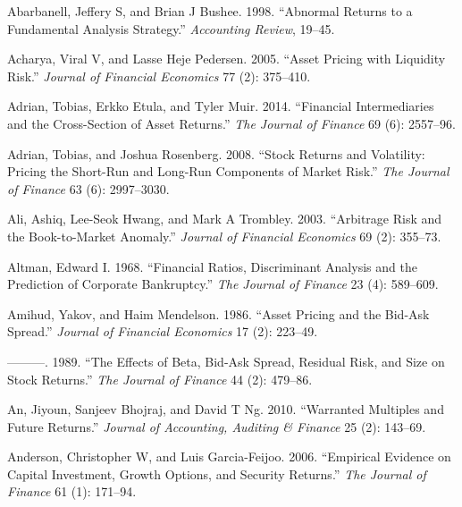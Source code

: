 \documentclass[
  letterpaper,
  DIV=11,
  numbers=noendperiod]{scrreprt}
\newlength{\cslhangindent}
\newlength{\cslentryspacingunit} %
\newenvironment{CSLReferences}[2] %
 {%
  \setlength{\parindent}{0pt}
  \ifodd #1
  \let\oldpar\par
  \def\par{\hangindent=\cslhangindent\oldpar}
  \fi
  \setlength{\parskip}{#2\cslentryspacingunit}
 }%
 {}
\begin{document}
\hypertarget{refs}{}
\begin{CSLReferences}{1}{0}
\leavevmode{}%
Abarbanell, Jeffery S, and Brian J Bushee. 1998. {``Abnormal Returns to
a Fundamental Analysis Strategy.''} \emph{Accounting Review}, 19--45.

\leavevmode{}%
Acharya, Viral V, and Lasse Heje Pedersen. 2005. {``Asset Pricing with
Liquidity Risk.''} \emph{Journal of Financial Economics} 77 (2):
375--410.

\leavevmode{}%
Adrian, Tobias, Erkko Etula, and Tyler Muir. 2014. {``Financial
Intermediaries and the Cross-Section of Asset Returns.''} \emph{The
Journal of Finance} 69 (6): 2557--96.

\leavevmode{}%
Adrian, Tobias, and Joshua Rosenberg. 2008. {``Stock Returns and
Volatility: Pricing the Short-Run and Long-Run Components of Market
Risk.''} \emph{The Journal of Finance} 63 (6): 2997--3030.

\leavevmode{}%
Ali, Ashiq, Lee-Seok Hwang, and Mark A Trombley. 2003. {``Arbitrage Risk
and the Book-to-Market Anomaly.''} \emph{Journal of Financial Economics}
69 (2): 355--73.

\leavevmode{}%
Altman, Edward I. 1968. {``Financial Ratios, Discriminant Analysis and
the Prediction of Corporate Bankruptcy.''} \emph{The Journal of Finance}
23 (4): 589--609.

\leavevmode{}%
Amihud, Yakov, and Haim Mendelson. 1986. {``Asset Pricing and the
Bid-Ask Spread.''} \emph{Journal of Financial Economics} 17 (2):
223--49.

\leavevmode{}%
---------. 1989. {``The Effects of Beta, Bid-Ask Spread, Residual Risk,
and Size on Stock Returns.''} \emph{The Journal of Finance} 44 (2):
479--86.

\leavevmode{}%
An, Jiyoun, Sanjeev Bhojraj, and David T Ng. 2010. {``Warranted
Multiples and Future Returns.''} \emph{Journal of Accounting, Auditing
\& Finance} 25 (2): 143--69.

\leavevmode{}%
Anderson, Christopher W, and Luis Garcia-Feijoo. 2006. {``Empirical
Evidence on Capital Investment, Growth Options, and Security Returns.''}
\emph{The Journal of Finance} 61 (1): 171--94.


\end{CSLReferences}
\end{document}
